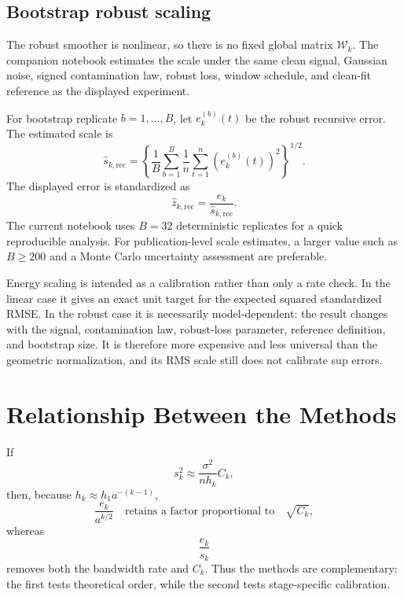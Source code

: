 \documentclass[11pt]{article}
\newcommand{\Wcal}{\mathcal{W}}
\begin{document}
\subsection{Bootstrap robust scaling}

The robust smoother is nonlinear, so there is no fixed global matrix
$\Wcal_k$. The companion notebook estimates the scale under the same clean
signal, Gaussian noise, signed contamination law, robust loss, window schedule,
and clean-fit reference as the displayed experiment.

For bootstrap replicate $b=1,\ldots,B$, let $e_k^{(b)}(t)$ be the robust
recursive error. The estimated scale is
\[
\widehat s_{k,\mathrm{rec}}
=\left\{
\frac{1}{B}\sum_{b=1}^{B}
\frac{1}{n}\sum_{t=1}^{n}
\left(e_k^{(b)}(t)\right)^2
\right\}^{1/2}.
\]
The displayed error is standardized as
\[
\widehat z_{k,\mathrm{rec}}
=\frac{e_k}{\widehat s_{k,\mathrm{rec}}}.
\]
The current notebook uses $B=32$ deterministic replicates for a quick
reproducible analysis.
For publication-level scale estimates, a larger value such as $B\geq200$ and a
Monte Carlo uncertainty assessment are preferable.

Energy scaling is intended as a calibration rather than only a rate check. In the
linear case it gives an exact unit target for the expected squared standardized
RMSE. In the robust case it is necessarily model-dependent: the result changes
with the signal, contamination law, robust-loss parameter, reference definition,
and bootstrap size. It is therefore more expensive and less universal than the
geometric normalization, and its RMS scale still does not calibrate sup errors.

\section{Relationship Between the Methods}

If
\[
s_k^2
\approx \frac{\sigma^2}{nh_k}C_k,
\]
then, because $h_k\approx h_1a^{-(k-1)}$,
\[
\frac{e_k}{a^{k/2}}
\quad\text{retains a factor proportional to}\quad
\sqrt{C_k},
\]
whereas
\[
\frac{e_k}{s_k}
\]
removes both the bandwidth rate and $C_k$. Thus the methods are complementary:
the first tests theoretical order, while the second tests stage-specific
calibration.
\end{document}

